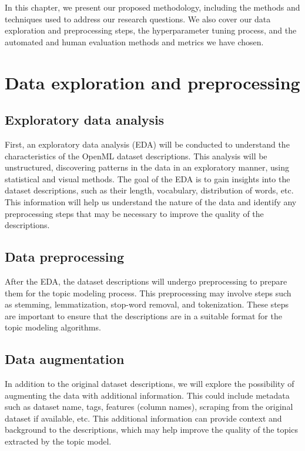 In this chapter, we present our proposed methodology, including the methods and techniques used to address our research questions. We also cover our data exploration and preprocessing steps, the hyperparameter tuning process, and the automated and human evaluation methods and metrics we have chosen.

\section{Data exploration and preprocessing}
\subsection{Exploratory data analysis}
First, an exploratory data analysis (EDA) will be conducted to understand the characteristics of the OpenML dataset descriptions. This analysis will be unstructured, discovering patterns in the data in an exploratory manner, using statistical and visual methods. The goal of the EDA is to gain insights into the dataset descriptions, such as their length, vocabulary, distribution of words, etc. This information will help us understand the nature of the data and identify any preprocessing steps that may be necessary to improve the quality of the descriptions.

\subsection{Data preprocessing}
After the EDA, the dataset descriptions will undergo preprocessing to prepare them for the topic modeling process. This preprocessing may involve steps such as stemming, lemmatization, stop-word removal, and tokenization. These steps are important to ensure that the descriptions are in a suitable format for the topic modeling algorithms.

\subsection{Data augmentation}
In addition to the original dataset descriptions, we will explore the possibility of augmenting the data with additional information. This could include metadata such as dataset name, tags, features (column names), scraping from the original dataset if available, etc. This additional information can provide context and background to the descriptions, which may help improve the quality of the topics extracted by the topic model.

